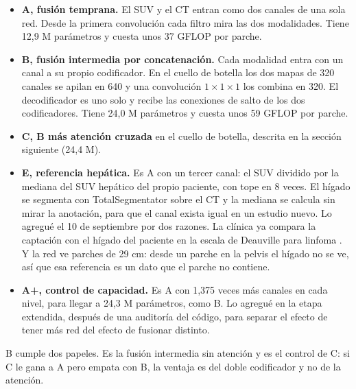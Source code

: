\begin{itemize}
\item \textbf{A, fusión temprana.} El SUV y el CT entran como dos canales de una sola red. Desde la primera convolución cada filtro mira las dos modalidades. Tiene 12,9 M parámetros y cuesta unos 37 GFLOP por parche.
\item \textbf{B, fusión intermedia por concatenación.} Cada modalidad entra con un canal a su propio codificador. En el cuello de botella los dos mapas de 320 canales se apilan en 640 y una convolución $1\times1\times1$ los combina en 320. El decodificador es uno solo y recibe las conexiones de salto de los dos codificadores. Tiene 24,0 M parámetros y cuesta unos 59 GFLOP por parche.
\item \textbf{C, B más atención cruzada} en el cuello de botella, descrita en la sección siguiente (24,4 M).
\item \textbf{E, referencia hepática.} Es A con un tercer canal: el SUV dividido por la mediana del SUV hepático del propio paciente, con tope en 8 veces. El hígado se segmenta con TotalSegmentator sobre el CT y la mediana se calcula sin mirar la anotación, para que el canal exista igual en un estudio nuevo. Lo agregué el 10 de septiembre por dos razones. La clínica ya compara la captación con el hígado del paciente en la escala de Deauville para linfoma \citep{barrington2014}. Y la red ve parches de 29 cm: desde un parche en la pelvis el hígado no se ve, así que esa referencia es un dato que el parche no contiene.
\item \textbf{A+, control de capacidad.} Es A con 1,375 veces más canales en cada nivel, para llegar a 24,3 M parámetros, como B. Lo agregué en la etapa extendida, después de una auditoría del código, para separar el efecto de tener más red del efecto de fusionar distinto.
\end{itemize}

B cumple dos papeles. Es la fusión intermedia sin atención y es el control de C: si C le gana a A pero empata con B, la ventaja es del doble codificador y no de la atención.

